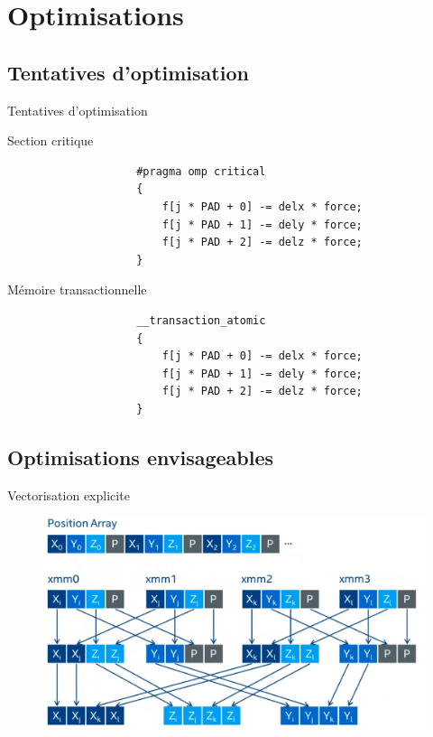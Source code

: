 \documentclass[9.5pt]{beamer}
\begin{document}
\section{Optimisations}
	\subsection{Tentatives d'optimisation}
		\begin{frame}[fragile]{Tentatives d'optimisation}
			\begin{block}{Section critique}
				\scriptsize
				\begin{verbatim}
					#pragma omp critical
					{
						f[j * PAD + 0] -= delx * force;
						f[j * PAD + 1] -= dely * force;
						f[j * PAD + 2] -= delz * force;
					}
				\end{verbatim}
			\end{block}

			\begin{block}{Mémoire transactionnelle}
				\scriptsize
				\begin{verbatim}
					__transaction_atomic
					{
						f[j * PAD + 0] -= delx * force;
						f[j * PAD + 1] -= dely * force;
						f[j * PAD + 2] -= delz * force;
					}
				\end{verbatim}
			\end{block}
\end{frame}

	\subsection{Optimisations envisageables}
		\begin{frame}{Vectorisation explicite}
			\begin{figure}
				\includegraphics[width=\linewidth]{images/vecto.png}
			\end{figure}
		\end{frame}
\end{document}
